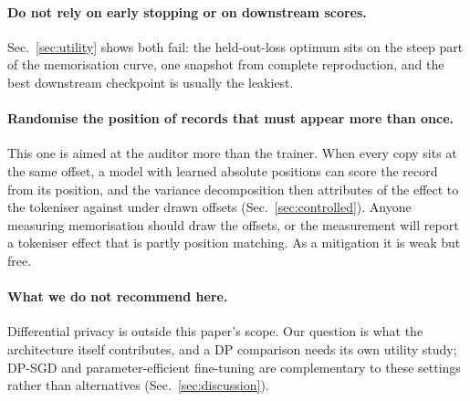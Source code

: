 \paragraph{Do not rely on early stopping or on downstream scores.}
Sec.~\ref{sec:utility} shows both fail: the held-out-loss optimum sits on the steep part of the
memorisation curve, one snapshot from complete reproduction, and the best downstream checkpoint is
usually the leakiest.

\paragraph{Randomise the position of records that must appear more than once.}
This one is aimed at the auditor more than the trainer. When every copy sits at the same offset, a
model with learned absolute positions can score the record from its position, and the variance
decomposition then attributes  of the effect to the tokeniser against  under
drawn offsets (Sec.~\ref{sec:controlled}). Anyone measuring memorisation should draw the offsets, or
the measurement will report a tokeniser effect that is partly position matching. As a mitigation it
is weak but free.

\paragraph{What we do not recommend here.}
Differential privacy is outside this paper's scope. Our question is what the architecture itself
contributes, and a DP comparison needs its own utility study; DP-SGD and parameter-efficient
fine-tuning are complementary to these settings rather than alternatives
(Sec.~\ref{sec:discussion}).

